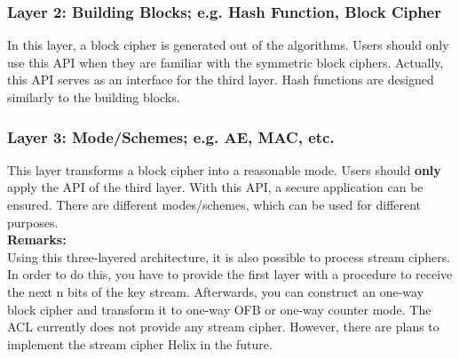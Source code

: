 \subsubsection{Layer 2: Building Blocks; e.g. Hash Function, Block Cipher}
In this layer, a block cipher is generated out of the algorithms. Users should only use this API when they are familiar with the symmetric block ciphers. Actually, this API serves as an interface for the third layer.
Hash functions are designed similarly to the building blocks.

\subsubsection{Layer 3: Mode/Schemes; e.g. AE, MAC, etc.}
This layer transforms a block cipher into a reasonable mode. Users should \textbf{only} apply the API of the third layer. With this API, a secure application can be ensured. 
There are different modes/schemes, which can be used for different purposes.\\
\textbf{Remarks:}\\
Using this three-layered architecture, it is also possible to process
stream ciphers. In order to do this, you have to provide the first layer with
a procedure to receive the next n bits of the key stream. Afterwards, you
can construct an one-way block cipher and transform
it to one-way OFB or one-way counter mode. The ACL currently does not provide
any stream cipher. However, there are plans to implement the stream cipher
Helix in the future.
